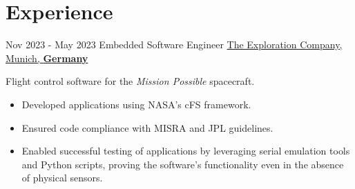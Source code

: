 \documentclass[letterpaper]{twentysecondcv} %
\begin{document}
\makeprofile %

%
%
\section{Experience}

\begin{twenty} %

    \twentyitem
        {Nov 2023 -}
        {May 2023}
        {Embedded Software Engineer}
        {\href{https://www.exploration.space/}{The Exploration Company, Munich, \textbf{Germany}}}
        {}
        {
            Flight control software for the \textit{Mission Possible} spacecraft.
            \vspace{1 mm}
            \begin{itemize}
                \item Developed applications  using NASA's cFS framework.
                \item Ensured code compliance with MISRA and JPL guidelines.
                \item Enabled successful testing of applications by leveraging serial emulation tools and Python scripts, proving the software's functionality even in the absence of physical sensors.
            \end{itemize}

}
\end{twenty}
\end{document}
